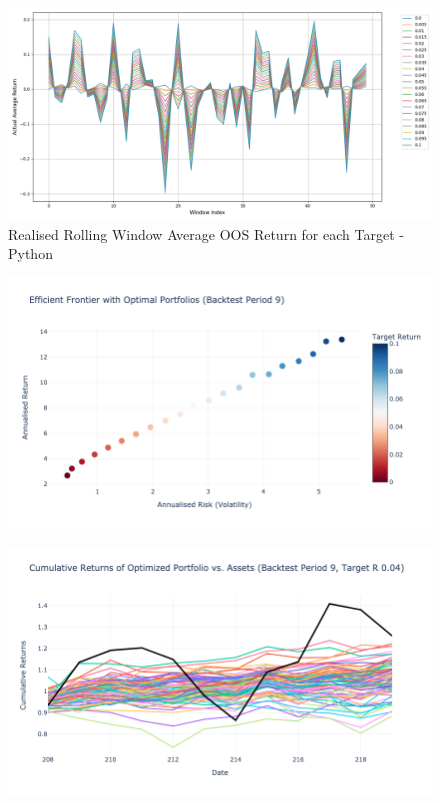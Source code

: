 \documentclass[12pt,twoside]{article}
\begin{document}
\begin{figure}[]
\centering %
\includegraphics[width = 1.0\hsize]{./figures/Realised_Rolling_Window_Average_OOS_Return.png} %
\caption{Realised Rolling Window Average OOS Return for each Target - Python} 
\label{fig:OOS_rets_python}
\end{figure}

\begin{figure}[]
\centering %
\includegraphics[width = 1.0\hsize]{./figures/efficint_frontier.png} %
    \caption{} 
\label{fig:efficint_frontier}
\end{figure}

\begin{figure}[]
\centering %
\includegraphics[width = 1.0\hsize]{./figures/Cumulative_Rets.png} %
\caption{} 
\label{fig:Cumulative_Rets}
\end{figure}
\end{document}
